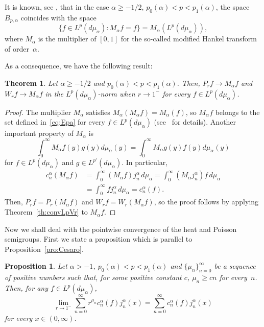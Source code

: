 \documentclass[11pt,a4paper]{amsart}
\newcommand{\ma}{M_{\alpha}}
\newcommand{\mua}{d\mu_\alpha}
\newcommand{\jna}{j_n^{\alpha}}
\newcommand{\cna}{c_n^{\alpha}}
\theoremstyle{plain}
\newtheorem{theor}{Theorem}
\newtheorem{propo}{Proposition}
\theoremstyle{remark}
\begin{document}
It is known, see \cite{V}, that in the case 
$\alpha \ge -1/2$, 
$p_0(\alpha) < p < p_1(\alpha)$,
the space $B_{p,\alpha}$ coincides with the space
\begin{equation}
\label{eq:Epa}
  \{ f \in L^p(\mua): \ma f = f\} = \ma(L^p(\mua)),
\end{equation}
where $\ma$ is the multiplier of $[0,1]$ for
the so-called modified Hankel transform of order~$\alpha$.

As a consequence, we have the following result:

\begin{theor}
\label{th:convMaf}
Let $\alpha \ge -1/2$ and $p_0(\alpha) < p < p_1(\alpha)$.
Then, $P_r f \to \ma f$ and $W_r f \to \ma f$ in the $L^p(\mua)$-norm when $r \to 1^-$
for every $f \in L^p(\mua)$.
\end{theor}

\begin{proof}
The multiplier $\ma$ satisfies $\ma(\ma f) = \ma(f)$,
so $\ma f$ belongs to the set defined in~\eqref{eq:Epa} for every $f \in L^p(\mua)$
(see~\cite{V} for details).
Another important property of $\ma$ is
\[
  \int_0^\infty \ma f(y) g(y) \mua(y)
  = \int_0^\infty \ma g(y) f(y) \mua(y)
\]
for $f \in L^p(\mua)$ and $g \in L^{p'}(\mua)$.
In particular,
\begin{align*}
  \cna(\ma f)
  &= \int_0^\infty (\ma f) \jna \,\mua
  = \int_0^\infty (\ma \jna) f \,\mua \\
  &= \int_0^\infty f \jna \,\mua = \cna(f).
\end{align*}
Then, $P_r f = P_r (\ma f)$ and $W_r f = W_r (\ma f)$,
so the proof follows by applying Theorem~\ref{th:convLpVr}
to $\ma f$.
\end{proof}


Now we shall deal with the pointwise convergence of the heat and Poisson semigroups.
First we state a proposition which is parallel to Proposition~\ref{pro:Cesaro}.

\begin{propo}
\label{pro:convaeVr}
Let $\alpha > -1$, $p_0(\alpha) < p < p_1(\alpha)$ and $\{\mu_n\}_{n=0}^\infty$
be a sequence of positive numbers such that, for some positive constant $c$,
$\mu_n \ge cn$ for every~$n$. Then, for any $f \in L^p(\mua)$, 
\[
  \lim_{r \to 1^-} \sum_{n=0}^\infty r^{\mu_n} \cna(f)\jna(x)
  = \sum_{n=0}^\infty \cna(f)\jna(x)
\]
for every $x \in (0,\infty)$.
\end{propo}
\end{document}
